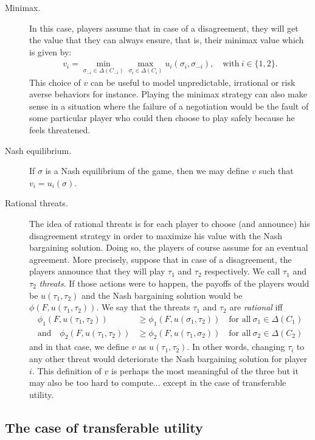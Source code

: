 \begin{description}
	\item[Minimax.] In this case, players assume that in case of a disagreement, they will get the value that they can always ensure, that is, their minimax value which is given by:
	\begin{align*}
		v_i = \min_{\sigma_{-i} \in \Delta(C_{-i})} \max_{\sigma_i \in \Delta(C_i)} u_i(\sigma_i, \sigma_{-i}), \quad \text{with} \ i \in \{1,2\}.
	\end{align*}
	This choice of $v$ can be useful to model unpredictable, irrational or risk averse behaviors for instance. Playing the minimax strategy can also make sense in a situation where the failure of a negotiation would be the fault of some particular player who could then choose to play safely because he feels threatened.
	\item[Nash equilibrium.] If $\sigma$ is a Nash equilibrium of the game, then we may define $v$ such that $v_i = u_i(\sigma)$.
	\item[Rational threats.] The idea of rational threats is for each player to choose (and announce) his disagreement strategy in order to maximize his value with the Nash bargaining solution. Doing so, the players of course assume for an eventual agreement. More precisely, suppose that in case of a disagreement, the players announce that they will play $\tau_1$ and $\tau_2$ respectively. We call $\tau_1$ and $\tau_2$ \emph{threats}. If those actions were to happen, the payoffs of the players would be $u(\tau_1, \tau_2)$ and the Nash bargaining solution would be $\phi(F, u(\tau_1, \tau_2))$. We say that the threats $\tau_1$ and $\tau_2$ are \emph{rational} iff
	\begin{align*}
		\phi_1(F, u(\tau_1, \tau_2)) &\geq \phi_1(F, u(\sigma_1, \tau_2)) \quad \text{for all} \ \sigma_1 \in \Delta(C_1)\\
		\text{and} \quad \phi_2(F, u(\tau_1, \tau_2)) &\geq \phi_2(F, u(\tau_1, \sigma_2)) \quad \text{for all} \ \sigma_2 \in \Delta(C_2)
	\end{align*}
	and in that case, we define $v$ as $u(\tau_1, \tau_2)$. In other words, changing $\tau_i$ to any other threat would deteriorate the Nash bargaining solution for player $i$. This definition of $v$ is perhaps the most meaningful of the three but it may also be too hard to compute... except in the case of transferable utility.
\end{description}



\subsection{The case of transferable utility}



